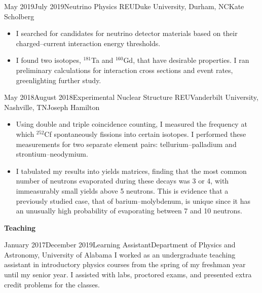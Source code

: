 \documentclass{cv}
\begin{document}
    \begin{research_exp}{May 2019}{July 2019}{Neutrino Physics REU}{Duke University, Durham, NC}{Kate Scholberg}
        \begin{itemize}
            \item I searched for candidates for neutrino detector materials based on their charged--current interaction energy thresholds.
            \item I found two isotopes, $^{181}$Ta and $^{160}$Gd, that have desirable properties. I ran preliminary calculations for interaction cross sections and event rates, greenlighting further study.
        \end{itemize}
    \end{research_exp}
    
    \begin{research_exp}{May 2018}{August 2018}{Experimental Nuclear Structure REU}{Vanderbilt University, Nashville, TN}{Joseph Hamilton}
        \begin{itemize}
            \item Using double and triple coincidence counting, I measured the frequency at which $^{252}$Cf spontaneously fissions into certain isotopes. I performed these measurements for two separate element pairs: tellurium--palladium and strontium--neodymium.
            \item I tabulated my results into yields matrices, finding that the most common number of neutrons evaporated during these decays was 3 or 4, with immeasurably small yields above 5 neutrons. This is evidence that a previously studied case, that of barium--molybdenum, is unique since it has an unusually high probability of evaporating between 7 and 10 neutrons.
        \end{itemize}
    \end{research_exp}
    \vspace{0.2in}
	
%
%
%
	
	\textbf{Teaching}\\
	\begin{employment}{January 2017}{December 2019}{Learning Assistant}{Department of Physics and Astronomy, University of Alabama}
	    I worked as an undergraduate teaching assistant in introductory physics courses from the spring of my freshman year until my senior year. I assisted with labs, proctored exams, and presented extra credit problems for the classes.
	\end{employment}
	\vspace{0.2in}
	
\end{document}
